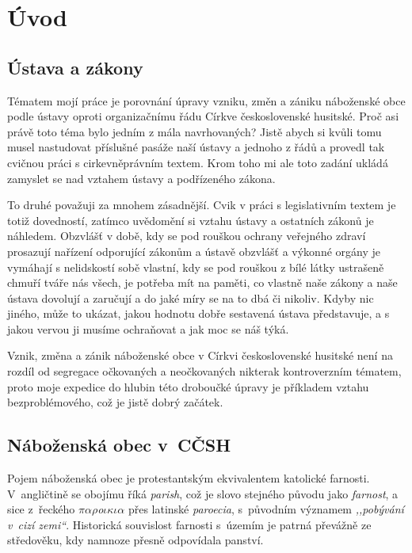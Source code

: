 \chapter{Úvod}
\label{kap:uvod}

\section{Ústava a zákony}

Tématem mojí práce je porovnání úpravy vzniku, změn a zániku náboženské obce
podle ústavy oproti organizačnímu řádu Církve československé husitské. Proč asi
právě toto téma bylo jedním z mála navrhovaných? Jistě abych si kvůli tomu musel
nastudovat příslušné pasáže naší ústavy a jednoho z řádů a provedl tak cvičnou
práci s cirkevněprávním textem. Krom toho mi ale toto zadání ukládá zamyslet se
nad vztahem ústavy a podřízeného zákona.

To druhé považuji za mnohem zásadnější. Cvik v práci s legislativním textem je
totiž dovedností, zatímco uvědomění si vztahu ústavy a ostatních zákonů je
náhledem. Obzvlášť v době, kdy se pod rouškou ochrany veřejného zdraví prosazují
nařízení odporující zákonům a ústavě obzvlášť a výkonné orgány je vymáhají s
nelidskostí sobě vlastní, kdy se pod rouškou z bílé látky ustrašeně chmuří tváře
nás všech, je potřeba mít na paměti, co vlastně naše zákony a naše ústava
dovolují a zaručují a do jaké míry se na to dbá či nikoliv. Kdyby nic jiného,
může to ukázat, jakou hodnotu dobře sestavená ústava představuje, a s jakou
vervou ji musíme ochraňovat a jak moc se náš týká.

Vznik, změna a zánik náboženské obce v Církvi československé husitské není na
rozdíl od segregace očkovaných a neočkovaných nikterak kontroverzním tématem,
proto moje expedice do hlubin této droboučké úpravy je příkladem vztahu
bezproblémového, což je jistě dobrý začátek.

\section{Náboženská obec v~CČSH}

Pojem náboženská obec je protestantským ekvivalentem katolické farnosti.
V~angličtině se obojímu říká \textit{parish}, což je slovo stejného původu jako
\textit{farnost}, a sice z~řeckého {$\pi\alpha\rho$\textit{o}$\iota\kappa\iota\alpha$} přes latinské
\textit{paroecia}, s~původním významem \textit{,,pobývání v~cizí zemi``}.
Historická souvislost farnosti s~územím je patrná převážně ze středověku, kdy
namnoze přesně odpovídala panství.


